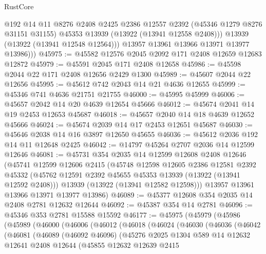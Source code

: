 \begin{lexlean}{RustCore}
\begin{coremodule}
              @192
              @14
              @11
              @8276
              @2408
              @2425
              @2386
              @12557
              @2392
              (@45346 @1279 @8276 @31151 @31155)
              @45353
              @13939
              (@13922 (@13941 @12558 @2408)))
            @13939
            (@13922 (@13941 @12548 @12564)))
          @13957
          @13961
          @13966
          @13971
          @13977
          @13986)))
@45975 := @45582 @12576 @2045 @2092 @171 @2408 @12659 @12683 @12872
@45979 := @45591 @2045 @171 @2408 @12658
@45986 := @45598 @2044 @22 @171 @2408 @12656 @2429 @1300
@45989 := @45607 @2044 @22 @12656
@45995 := @45612 @742 @2043 @14 @21 @4636 @12655
@45999 := @45346 @741 @4636 @21751 @21755
@46000 := @45995 @45999
@46006 := @45657 @2042 @14 @20 @4639 @12654 @45666
@46012 := @45674 @2041 @14 @19 @2453 @12653 @45687
@46018 := @45657 @2040 @14 @18 @4639 @12652 @45666
@46024 := @45674 @2039 @14 @17 @2453 @12651 @45687
@46030 := @45646 @2038 @14 @16 @3897 @12650 @45655
@46036 := @45612 @2036 @192 @14 @11 @12648 @2425
@46042 := @14797 @45264 @2707 @2036 @14 @12599 @12646
@46081 := @45731
    @354
    @2035
    @14
    @12599
    @12608
    @2408
    @12646
    (@45741
      @12599
      @12606
      @2415
      (@45748
        @12598
        @12605
        @2386
        @12581
        @2392
        @45332
        (@45762 @12591 @2392 @45655 @45353 @13939 (@13922 (@13941 @12592 @2408)))
        @13939
        (@13922 (@13941 @12582 @12598)))
      @13957
      @13961
      @13966
      @13971
      @13977
      @13986)
@46089 := @45377 @12608 @354 @2035 @14 @2408 @2781 @12632 @12644
@46092 := @45387 @354 @14 @2781
@46096 := @45346 @353 @2781 @15588 @15592
@46177 := @45975
    (@45979
      (@45986
        (@45989
          (@46000
            (@46006
              (@46012
                (@46018
                  (@46024
                    (@46030
                      (@46036
                        (@46042
                          (@46081
                            (@46089
                              (@46092 @46096)
                              (@45276
                                @2025
                                @1304
                                @589
                                @14
                                @12632
                                @12641
                                @2408
                                @12644
                                (@45855
                                  @12632
                                  @12639
                                  @2415

\end{coremodule}
\end{lexlean}
